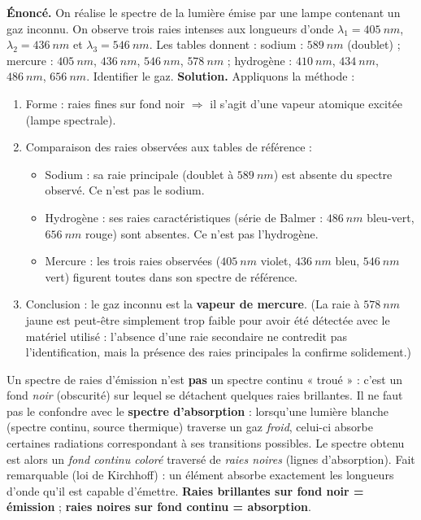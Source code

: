\documentclass[11pt]{article}
\begin{document}
\begin{exoresolu}
\textbf{Énoncé.} On réalise le spectre de la lumière émise par une lampe contenant un gaz inconnu. On observe trois raies intenses aux longueurs d'onde $\lambda_1 = \SI{405}{nm}$, $\lambda_2 = \SI{436}{nm}$ et $\lambda_3 = \SI{546}{nm}$. Les tables donnent : sodium : $\SI{589}{nm}$ (doublet) ; mercure : $\SI{405}{nm}$, $\SI{436}{nm}$, $\SI{546}{nm}$, $\SI{578}{nm}$ ; hydrogène : $\SI{410}{nm}$, $\SI{434}{nm}$, $\SI{486}{nm}$, $\SI{656}{nm}$. Identifier le gaz.
\tcblower
\textbf{Solution.} Appliquons la méthode :
\begin{enumerate}
\item Forme : raies fines sur fond noir $\Rightarrow$ il s'agit d'une vapeur atomique excitée (lampe spectrale).
\item Comparaison des raies observées aux tables de référence :
\begin{itemize}
\item Sodium : sa raie principale (doublet à $\SI{589}{nm}$) est absente du spectre observé. Ce n'est pas le sodium.
\item Hydrogène : ses raies caractéristiques (série de Balmer : $\SI{486}{nm}$ bleu-vert, $\SI{656}{nm}$ rouge) sont absentes. Ce n'est pas l'hydrogène.
\item Mercure : les trois raies observées ($\SI{405}{nm}$ violet, $\SI{436}{nm}$ bleu, $\SI{546}{nm}$ vert) figurent toutes dans son spectre de référence.
\end{itemize}
\item Conclusion : le gaz inconnu est la \textbf{vapeur de mercure}. (La raie à $\SI{578}{nm}$ jaune est peut-être simplement trop faible pour avoir été détectée avec le matériel utilisé : l'absence d'une raie secondaire ne contredit pas l'identification, mais la présence des raies principales la confirme solidement.)
\end{enumerate}
\end{exoresolu}

\begin{attention}
Un spectre de raies d'émission n'est \textbf{pas} un spectre continu « troué » : c'est un fond \emph{noir} (obscurité) sur lequel se détachent quelques raies brillantes. Il ne faut pas le confondre avec le \textbf{spectre d'absorption} : lorsqu'une lumière blanche (spectre continu, source thermique) traverse un gaz \emph{froid}, celui-ci absorbe certaines radiations correspondant à ses transitions possibles. Le spectre obtenu est alors un \emph{fond continu coloré} traversé de \emph{raies noires} (lignes d'absorption). Fait remarquable (loi de Kirchhoff) : un élément absorbe exactement les longueurs d'onde qu'il est capable d'émettre. \textbf{Raies brillantes sur fond noir = émission} ; \textbf{raies noires sur fond continu = absorption}.
\end{attention}
\end{document}
